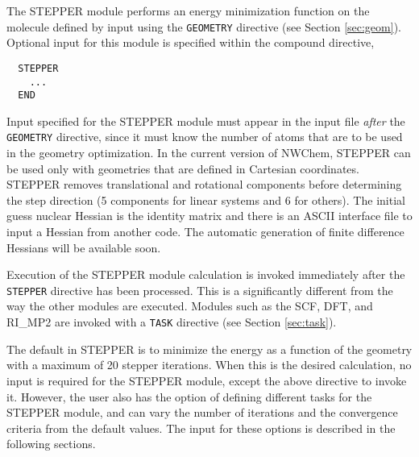 \label{sec:stepper}

The STEPPER module performs an energy minimization function on the molecule
defined by input using the \verb+GEOMETRY+ directive (see Section 
\ref{sec:geom}).  Optional input for this module is specified within
the compound directive,

\begin{verbatim}
  STEPPER
    ...
  END
\end{verbatim}

Input specified for the STEPPER module must appear in the input file 
{\em after} the \verb+GEOMETRY+ directive, since it must know the
number of atoms that are to be used in the geometry optimization.
In the current version of NWChem, STEPPER can be used  only with geometries
that are defined in 
Cartesian coordinates.  STEPPER removes translational and
rotational components before determining the step direction (5
components for linear systems and 6 for others).  The initial guess
nuclear Hessian is the identity matrix and there is an ASCII interface
file to input a Hessian from another code.  The automatic generation
of finite difference Hessians will be available soon.

Execution of the STEPPER module calculation is invoked immediately after the 
\verb+STEPPER+ directive has been processed.  This is a significantly
different from the way the other modules are executed.  Modules such as
the SCF, DFT, and RI\_MP2 are invoked with a \verb+TASK+ directive (see
Section \ref{sec:task}).

The default in STEPPER is to minimize the energy as a function of the 
geometry with a maximum of 20 stepper iterations.  When this is the
desired calculation, no input is required for the STEPPER module, except
the above directive to invoke it.  However, the user also has the option
of defining different tasks for the STEPPER module, and can vary the
number of iterations and the convergence criteria from the default values.  
The input for these options
is described in the following sections.



